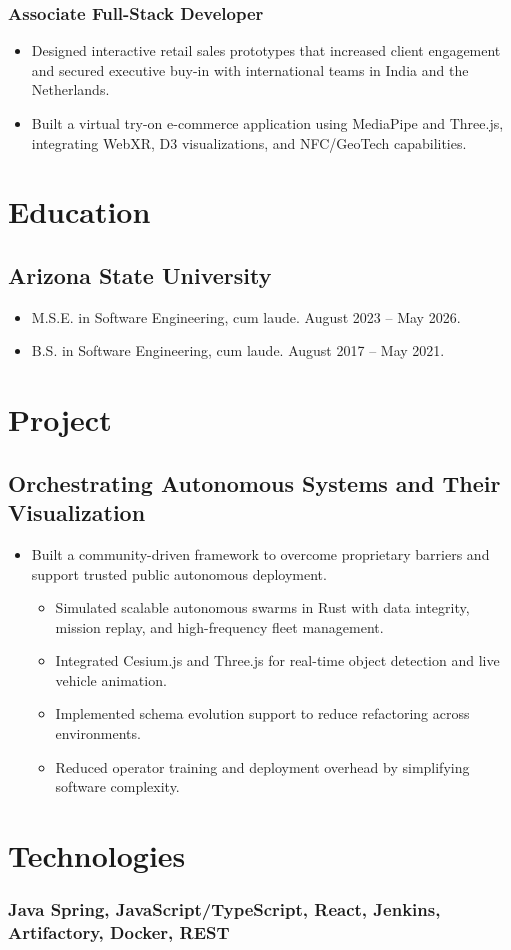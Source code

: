 \documentclass{article}
\begin{document}
	\subsubsection{Associate Full-Stack Developer}
	\begin{itemize}
		\item Designed interactive retail sales prototypes that increased client engagement and secured executive buy-in with international teams in India and the Netherlands.
		\item Built a virtual try-on e-commerce application using MediaPipe and Three.js, integrating WebXR, D3 visualizations, and NFC/GeoTech capabilities.
	\end{itemize}

\section{Education}
	\subsection{Arizona State University}
	\begin{itemize}
		\item M.S.E. in Software Engineering, cum laude. \hfill August 2023 – May 2026.
		\item B.S. in Software Engineering, cum laude. \hfill August 2017 – May 2021.
	\end{itemize}

\section{Project}
	\subsection{Orchestrating Autonomous Systems and Their Visualization}
	\begin{itemize}
		\item Built a community-driven framework to overcome proprietary barriers and support trusted public autonomous deployment.
		\begin{itemize}
			\item Simulated scalable autonomous swarms in Rust with data integrity, mission replay, and high-frequency fleet management.
			\item Integrated Cesium.js and Three.js for real-time object detection and live vehicle animation.
			\item Implemented schema evolution support to reduce refactoring across environments.
			\item Reduced operator training and deployment overhead by simplifying software complexity.
		\end{itemize}
	\end{itemize}

\section{Technologies}
	\subsubsection{Java Spring, JavaScript/TypeScript, React, Jenkins, Artifactory, Docker, REST}
\end{document}
